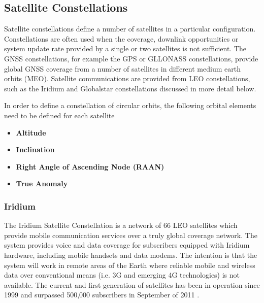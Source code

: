 \newpage
\subsection{Satellite Constellations}
Satellite constellations define a number of satellites in a particular configuration. Constellations are often used when the coverage, downlink opportunities or system update rate provided by a single or two satellites is not sufficient. The GNSS constellations, for example the GPS or GLLONASS constellations, provide global GNSS coverage from a number of satellites in different medium earth orbits (MEO). Satellite communications are provided from LEO constellations, such as the Iridium and Globalstar constellations discussed in more detail below.

In order to define a constellation of circular orbits, the following orbital elements need to be defined for each satellite
\begin{itemize}
	\item \textbf{Altitude}
	\item \textbf{Inclination}
	\item \textbf{Right Angle of Ascending Node (RAAN)}
	\item \textbf{True Anomaly}
\end{itemize}

\subsubsection{Iridium} \label{sec:iridium}
The Iridium Satellite Constellation is a network of 66 LEO satellites which provide mobile communication services over a truly global coverage network. The system provides voice and data coverage for subscribers equipped with Iridium hardware, including mobile handsets and data modems. The intention is that the system will work in remote areas of the Earth where reliable mobile and wireless data over conventional means (i.e. 3G and emerging 4G technologies) is not available. The current and first generation of satellites has been in operation since 1999 and surpassed 500,000 subscribers in September of 2011 \cite{Iridium_subscribers_2011}.


